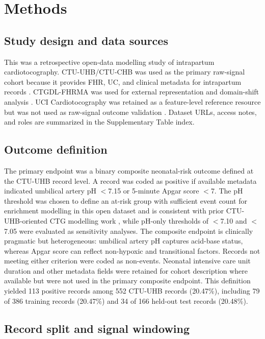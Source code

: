\documentclass[utf8]{FrontiersinHarvard}
\begin{document}
\section{Methods}

\subsection{Study design and data sources}

This was a retrospective open-data modelling study of intrapartum cardiotocography. CTU-UHB/CTU-CHB was used as the primary raw-signal cohort because it provides FHR, UC, and clinical metadata for intrapartum records \citep{goldberger2000,chudacek2014,ctuuhb}. CTGDL-FHRMA was used for external representation and domain-shift analysis \citep{ctgdl}. UCI Cardiotocography was retained as a feature-level reference resource but was not used as raw-signal outcome validation \citep{uci}. Dataset URLs, access notes, and roles are summarized in the Supplementary Table index.

\subsection{Outcome definition}

The primary endpoint was a binary composite neonatal-risk outcome defined at the CTU-UHB record level. A record was coded as positive if available metadata indicated umbilical artery pH $<$7.15 or 5-minute Apgar score $<$7. The pH threshold was chosen to define an at-risk group with sufficient event count for enrichment modelling in this open dataset and is consistent with prior CTU-UHB-oriented CTG modelling work \citep{chudacek2014,deepctg2023}, while pH-only thresholds of $<$7.10 and $<$7.05 were evaluated as sensitivity analyses. The composite endpoint is clinically pragmatic but heterogeneous: umbilical artery pH captures acid-base status, whereas Apgar score can reflect non-hypoxic and transitional factors. Records not meeting either criterion were coded as non-events. Neonatal intensive care unit duration and other metadata fields were retained for cohort description where available but were not used in the primary composite endpoint. This definition yielded 113 positive records among 552 CTU-UHB records (20.47\%), including 79 of 386 training records (20.47\%) and 34 of 166 held-out test records (20.48\%).

\subsection{Record split and signal windowing}
\end{document}
